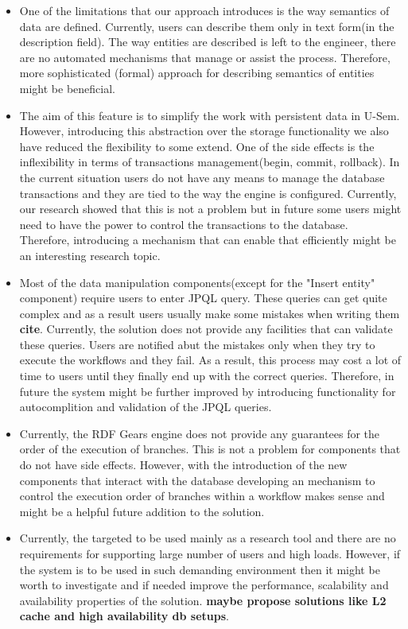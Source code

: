 \documentclass[a4paper, notitlepage]{article}
\begin{document}
\begin{itemize}
\item One of the limitations that our approach introduces is the way semantics of data are defined. Currently, users can describe them only in text form(in the description field). The way entities are described is left to the engineer, there are no automated mechanisms that manage or assist the process. Therefore, more sophisticated (formal) approach for describing semantics of entities might be beneficial.

\item The aim of this feature is to simplify the work with persistent data in U-Sem. However, introducing this abstraction over the storage functionality we also have reduced the flexibility to some extend. One of the side effects is the inflexibility in terms of transactions management(begin, commit, rollback). In the current situation users do not have any means to manage the database transactions and they are tied to the way the engine is configured. Currently, our research showed that this is not a problem but in future some users might need to have the power to control the transactions to the database. Therefore, introducing a mechanism that can enable that efficiently might be an interesting research topic.

\item Most of the data manipulation components(except for the "Insert entity" component) require users to enter JPQL query. These queries can get quite complex and as a result users usually make some mistakes when writing them \textbf{cite}. Currently, the solution does not provide any facilities that can validate these queries. Users are notified abut the mistakes only when they try to execute the workflows and they fail. As a result, this process may cost a lot of time to users until they finally end up with the correct queries. Therefore, in future the system might be further improved by introducing functionality for autocomplition and validation of the JPQL queries.

\item Currently, the RDF Gears engine does not provide any guarantees for the order of the execution of branches. This is not a problem for components that do not have side effects. However, with the introduction of the new components that interact with the database developing an mechanism to control the execution order of branches within a workflow makes sense and might be a helpful future addition to the solution.

\item Currently, the targeted to be used mainly as a research tool and there are no requirements for supporting large number of users and high loads. However, if the system is to be used in such demanding environment then it might be worth to investigate and if needed improve the performance, scalability and availability properties of the solution. \textbf{maybe propose solutions like L2 cache and high availability db setups}. 

\end{itemize}
\end{document}

